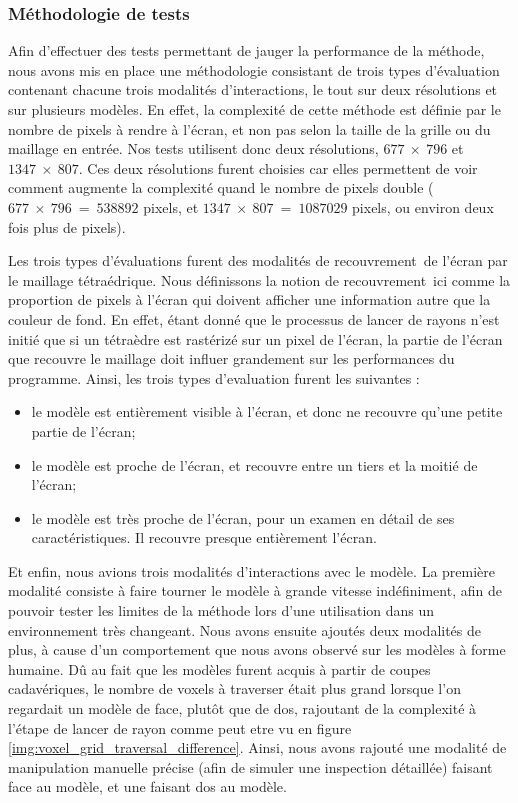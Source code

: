 {{{			\subsubsection{Méthodologie de tests}
			{
                Afin d'effectuer des tests permettant de jauger la performance de la méthode, nous avons mis en place une méthodologie consistant de trois types d'évaluation contenant chacune trois modalités d'interactions, le tout sur deux résolutions et sur plusieurs modèles. En effet, la complexité de cette méthode est définie par le nombre de pixels à rendre à l'écran, et non pas selon la taille de la grille ou du maillage en entrée. Nos tests utilisent donc deux résolutions, $677~\times~796$ et $1347~\times~807$. Ces deux résolutions furent choisies car elles permettent de voir comment augmente la complexité quand le nombre de pixels double ($677~\times~796~=~538892$ pixels, et $1347~\times~807~=~1087029$ pixels, ou environ deux fois plus de pixels).

                Les trois types d'évaluations furent des modalités de \og{}recouvrement~\fg de l'écran par le maillage tétraédrique. Nous définissons la notion de \og{}recouvrement~\fg ici comme la proportion de pixels à l'écran qui doivent afficher une information autre que la couleur de fond. En effet, étant donné que le processus de lancer de rayons n'est initié que si un tétraèdre est rastérizé sur un pixel de l'écran, la partie de l'écran que recouvre le maillage doit influer grandement sur les performances du programme. Ainsi, les trois types d'evaluation furent les suivantes :\begin{itemize}
                    \item le modèle est entièrement visible à l'écran, et donc ne recouvre qu'une petite partie de l'écran;
                    \item le modèle est proche de l'écran, et recouvre entre un tiers et la moitié de l'écran;
                    \item le modèle est très proche de l'écran, pour un examen en détail de ses caractéristiques. Il recouvre presque entièrement l'écran.
                \end{itemize}

			    Et enfin, nous avions trois modalités d'interactions avec le modèle. La première modalité consiste à faire tourner le modèle à grande vitesse indéfiniment, afin de pouvoir tester les limites de la méthode lors d'une utilisation dans un environnement très changeant. Nous avons ensuite ajoutés deux modalités de plus, à cause d'un comportement que nous avons observé sur les modèles à forme humaine. Dû au fait que les modèles furent acquis à partir de coupes cadavériques, le nombre de voxels à traverser était plus grand lorsque l'on regardait un modèle de face, plutôt que de dos, rajoutant de la complexité à l'étape de lancer de rayon comme peut etre vu en figure \ref{img:voxel_grid_traversal_difference}. Ainsi, nous avons rajouté une modalité de manipulation manuelle précise (afin de simuler une inspection détaillée) faisant face au modèle, et une faisant dos au modèle.

}}}}
